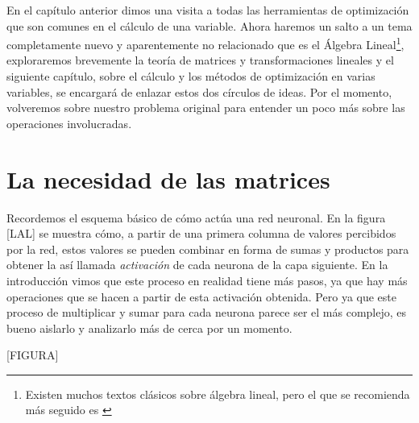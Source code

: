 En el capítulo anterior dimos una visita a todas las herramientas de optimización que son comunes en el cálculo de una variable. Ahora haremos un salto a un tema completamente nuevo y aparentemente no relacionado que es el Álgebra Lineal\footnote{Existen muchos textos clásicos sobre álgebra lineal, pero el que se recomienda más seguido es \cite{HoffmanLA}}, exploraremos brevemente la teoría de matrices y transformaciones lineales y el siguiente capítulo, sobre el cálculo y los métodos de optimización en varias variables, se encargará de enlazar estos dos círculos de ideas. Por el momento, volveremos sobre nuestro problema original para entender un poco más sobre las operaciones involucradas.

\section{La necesidad de las matrices}

Recordemos el esquema básico de cómo actúa una red neuronal. En la figura [LAL] se muestra cómo, a partir de una primera columna de valores percibidos por la red, estos valores se pueden combinar en forma de sumas y productos para obtener la así llamada \textit{activación} de cada neurona de la capa siguiente. En la introducción vimos que este proceso en realidad tiene más pasos, ya que hay más operaciones que se hacen a partir de esta activación obtenida. Pero ya que este proceso de multiplicar y sumar para cada neurona parece ser el más complejo, es bueno aislarlo y analizarlo más de cerca por un momento.

[FIGURA]

